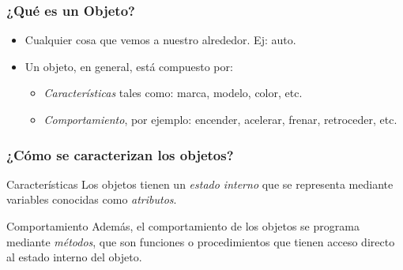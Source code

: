 \documentclass{beamer}
\begin{document}
\begin{frame}
  \frametitle{¿Qué es un Objeto?}

  \begin{exampleblock}{}
    \begin{itemize}
    \item[] Cualquier cosa que vemos a nuestro alrededor. Ej: auto.
    \item[] Un objeto, en general, está compuesto por:
      \begin{itemize}
      \item \emph{Características} tales como: marca, modelo, color, etc.
      \item \emph{Comportamiento}, por ejemplo: encender, acelerar, frenar, retroceder, etc.
      \end{itemize}
    \end{itemize}
  \end{exampleblock}
\end{frame}

\begin{frame}
  \frametitle{¿Cómo se caracterizan los objetos?}

  \begin{block}{Características}
    Los objetos tienen un \emph{estado interno} que se representa
    mediante variables conocidas como \emph{atributos}.
  \end{block}

  \begin{block}{Comportamiento}
    Además, el comportamiento de los objetos se programa mediante
    \emph{métodos}, que son funciones o procedimientos que tienen acceso
    directo al estado interno del objeto.
  \end{block}

\end{frame}
\end{document}
